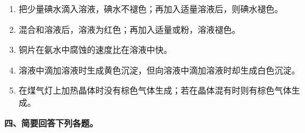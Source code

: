 \begin{enumerate}[label=\arabic*., start=1, itemsep=1.5ex]
    \item 把少量碘水滴入溶液，碘水不褪色；再加入适量溶液后，则碘水褪色。
    \item 混合和溶液后，溶液为红色；再加入适量或粉，溶液褪色。
    \item 铜片在氨水中腐蚀的速度比在溶液中快。
    \item {}溶液中滴加溶液时生成黄色沉淀，但向溶液中滴加溶液时却生成白色沉淀。
    \item 在煤气灯上加热晶体时没有棕色气体生成；若在晶体混有时则有棕色气体生成。
\end{enumerate}

\vspace{0.5cm}
\noindent\textbf{四、简要回答下列各题。}

